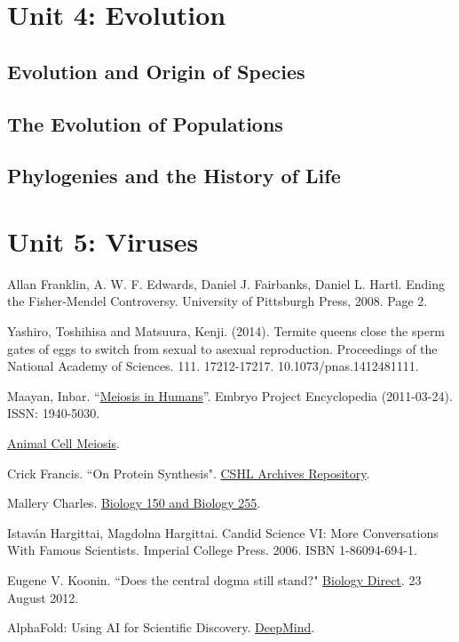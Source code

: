 \documentclass[12pt]{article}
\begin{document}
\section{Unit 4: Evolution}
\subsection{Evolution and Origin of Species}
\subsection{The Evolution of Populations}
\subsection{Phylogenies and the History of Life}

\section{Unit 5: Viruses}

\begin{thebibliography}{00}
     Allan Franklin, A. W. F. Edwards, Daniel J. Fairbanks, Daniel L. Hartl. Ending the Fisher-Mendel Controversy. University of Pittsburgh Press, 2008. Page 2.

     Yashiro, Toshihisa and Matsuura, Kenji. (2014). Termite queens close the sperm gates of eggs to switch from sexual to asexual reproduction. Proceedings of the National Academy of Sciences. 111. 17212-17217. 10.1073/pnas.1412481111. 

     Maayan, Inbar. ``\href{http://embryo.asu.edu/handle/10776/2084}{Meiosis in Humans}''. Embryo Project Encyclopedia (2011-03-24). ISSN: 1940-5030. 

     \href{https://www.cellsalive.com/meiosis_js.htm}{Animal Cell Meiosis}.

     Crick Francis. ``On Protein Synthesis". \href{https://libgallery.cshl.edu}{CSHL Archives Repository}.

     Mallery Charles. \href{http://henge.bio.miami.edu/mallery/150/}{Biology 150 and Biology 255}.
        
     Istav{\'a}n Hargittai, Magdolna Hargittai. Candid Science VI: More Conversations With Famous Scientists. Imperial College Press. 2006. ISBN 1-86094-694-1.

     Eugene V. Koonin. ``Does the central dogma still stand?" \href{https://biologydirect.biomedcentral.com/articles/10.1186/1745-6150-7-27}{Biology Direct}. 23 August 2012. 
        
     AlphaFold: Using AI for Scientific Discovery. \href{https://deepmind.com/blog/article/AlphaFold-Using-AI-for-scientific-discovery}{DeepMind}.
\end{thebibliography}
\end{document}
